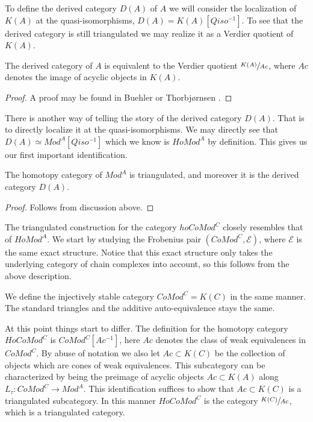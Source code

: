 \documentclass[../thesis.tex]{subfiles}
\begin{document}
            To define the derived category $D(A)$ of $A$ we will consider the localization of $K(A)$ at the quasi-isomorphisms, $D(A) = K(A)[Qiso^{-1}]$. To see that the derived category is still triangulated we may realize it as a Verdier quotient of $K(A)$.

            \begin{proposition}
                The derived category of $A$ is equivalent to the Verdier quotient $\sfrac{K(A)}{Ac}$, where $Ac$ denotes the image of acyclic objects in $K(A)$.
            \end{proposition}

            \begin{proof}
                A proof may be found in Buehler \cite{Buhler10} or Thorbjørnsen \cite{Thorbjornsen21}.
            \end{proof}

            There is another way of telling the story of the derived category $D(A)$. That is to directly localize it at the quasi-isomorphisms. We may directly see that $D(A) \simeq Mod^A[Qiso^{-1}]$ which we know is $HoMod^A$ by definition. This gives us our first important identification.

            \begin{thm}
                The homotopy category of $Mod^A$ is triangulated, and moreover it is the derived category $D(A)$.
            \end{thm}

            \begin{proof}
                Follows from discussion above.
            \end{proof}

            The triangulated construction for the category $hoCoMod^C$ closely resembles that of $HoMod^A$. We start by studying the Frobenius pair $(CoMod^C, \mathcal{E})$, where $\mathcal{E}$ is the same exact structure. Notice that this exact structure only takes the underlying category of chain complexes into account, so this follows from the above description.

            We define the injectively stable category \underline{$CoMod^C$}$=K(C)$ in the same manner. The standard triangles and the additive auto-equivalence stays the same.

            At this point things start to differ. The definition for the homotopy category $HoCoMod^C$ is $CoMod^C[Ac^{-1}]$, here $Ac$ denotes the class of weak equivalences in $CoMod^C$. By abuse of notation we also let $Ac\subset K(C)$ be the collection of objects which are cones of weak equivalences. This subcategory can be characterized by being the preimage of acyclic objects $Ac\subset K(A)$ along $L_\tau : CoMod^C \rightarrow Mod^A$. This identification suffices to show that $Ac\subset K(C)$ is a triangulated subcategory. In this manner $HoCoMod^C$ is the category $\sfrac{K(C)}{Ac}$, which is a triangulated category.
\end{document}
